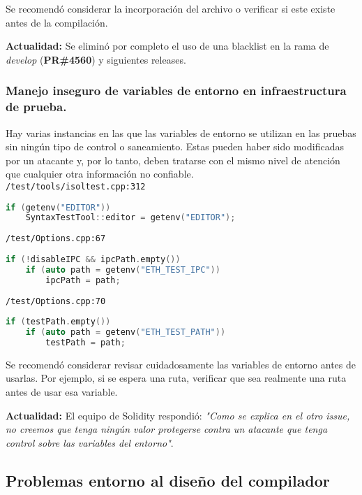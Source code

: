 Se recomendó considerar la incorporación del archivo o verificar si este existe antes de la compilación.

\textbf{Actualidad:} Se eliminó por completo el uso de una blacklist en la rama de \textit{develop} (\textbf{PR\#4560}\cite{GHPR4560}) y siguientes releases.

\subsubsection{Manejo inseguro de variables de entorno en infraestructura de prueba.}

Hay varias instancias en las que las variables de entorno se utilizan en las pruebas sin ningún tipo de control o saneamiento. Estas pueden haber sido modificadas por un atacante y, por lo tanto, deben tratarse con el mismo nivel de atención que cualquier otra información no confiable.\\

\verb|/test/tools/isoltest.cpp:312|
\begin{lstlisting}[language=c++]
if (getenv("EDITOR"))
    SyntaxTestTool::editor = getenv("EDITOR");
\end{lstlisting}

\verb|/test/Options.cpp:67|
\begin{lstlisting}[language=c++]
if (!disableIPC && ipcPath.empty())
    if (auto path = getenv("ETH_TEST_IPC"))
        ipcPath = path;
\end{lstlisting}

\verb|/test/Options.cpp:70|
\begin{lstlisting}[language=c++]
if (testPath.empty())
    if (auto path = getenv("ETH_TEST_PATH"))
        testPath = path;
\end{lstlisting}

Se recomendó considerar revisar cuidadosamente las variables de entorno antes de usarlas. Por ejemplo, si se espera una ruta, verificar que sea realmente una ruta antes de usar esa variable.

\textbf{Actualidad:} El equipo de Solidity respondió: \textit{"Como se explica en el otro issue, no creemos que tenga ningún valor protegerse contra un atacante que tenga control sobre las variables del entorno"}.

\subsection{Problemas entorno al diseño del compilador}

